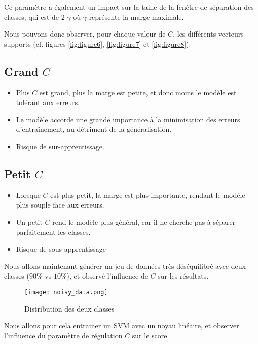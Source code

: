 \documentclass{article}
\begin{document}
Ce paramètre a également un impact sur la taille de la fenêtre de séparation des classes, qui est de 2 $\gamma$ où $\gamma$ représente la marge maximale.


Nous pouvons donc observer, pour chaque valeur de $C$, les différents vecteurs supports (cf. figures \ref{fig:figure6}, \ref{fig:figure7} et \ref{fig:figure8}).




\subsection*{Grand $C$}

\begin{itemize}
    \item Plus $C$ est grand, plus la marge est petite, et donc moins le modèle est tolérant aux erreurs.
    \item Le modèle accorde une grande importance à la minimisation des erreurs d'entraînement, au détriment de la généralisation.
    \item Risque de sur-apprentissage.
\end{itemize}

\subsection*{Petit $C$}

\begin{itemize}
    \item Lorsque $C$ est plus petit, la marge est plus importante, rendant le modèle plus souple face aux erreurs.
    \item Un petit $C$ rend le modèle plus général, car il ne cherche pas à séparer parfaitement les classes.
    \item Risque de sous-apprentissage
\end{itemize}


Nous allons maintenant générer un jeu de données très déséquilibré avec deux classes ($ 90\% $ vs $ 10\% $), et observé l'influence de $C$ sur les résultats.



\begin{figure}[H]
    \centering
    \texttt{[image: noisy\_data.png]}
    \caption{Distribution des deux classes}
    \label{fig:enter-label}
\end{figure}

Nous allons pour cela entrainer un SVM avec un noyau linéaire, et observer l'influence du paramètre de régulation $C$ sur le score.
\end{document}
